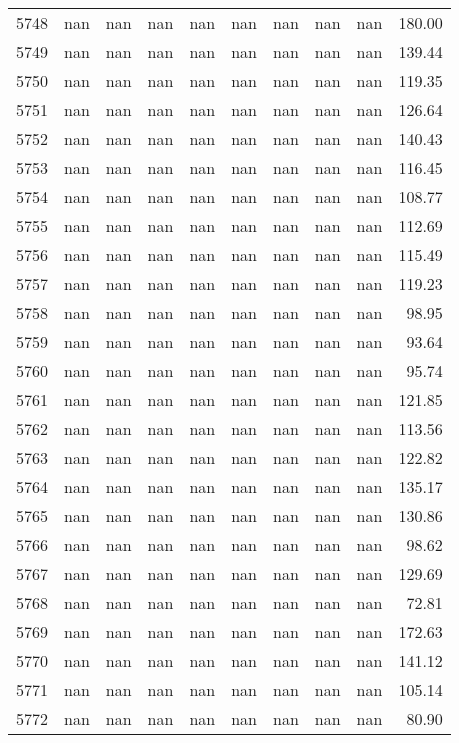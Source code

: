 \begin{tabular}{lrrrrrrrrr}
5748 & nan & nan & nan & nan & nan & nan & nan & nan & 180.00 \\
5749 & nan & nan & nan & nan & nan & nan & nan & nan & 139.44 \\
5750 & nan & nan & nan & nan & nan & nan & nan & nan & 119.35 \\
5751 & nan & nan & nan & nan & nan & nan & nan & nan & 126.64 \\
5752 & nan & nan & nan & nan & nan & nan & nan & nan & 140.43 \\
5753 & nan & nan & nan & nan & nan & nan & nan & nan & 116.45 \\
5754 & nan & nan & nan & nan & nan & nan & nan & nan & 108.77 \\
5755 & nan & nan & nan & nan & nan & nan & nan & nan & 112.69 \\
5756 & nan & nan & nan & nan & nan & nan & nan & nan & 115.49 \\
5757 & nan & nan & nan & nan & nan & nan & nan & nan & 119.23 \\
5758 & nan & nan & nan & nan & nan & nan & nan & nan & 98.95 \\
5759 & nan & nan & nan & nan & nan & nan & nan & nan & 93.64 \\
5760 & nan & nan & nan & nan & nan & nan & nan & nan & 95.74 \\
5761 & nan & nan & nan & nan & nan & nan & nan & nan & 121.85 \\
5762 & nan & nan & nan & nan & nan & nan & nan & nan & 113.56 \\
5763 & nan & nan & nan & nan & nan & nan & nan & nan & 122.82 \\
5764 & nan & nan & nan & nan & nan & nan & nan & nan & 135.17 \\
5765 & nan & nan & nan & nan & nan & nan & nan & nan & 130.86 \\
5766 & nan & nan & nan & nan & nan & nan & nan & nan & 98.62 \\
5767 & nan & nan & nan & nan & nan & nan & nan & nan & 129.69 \\
5768 & nan & nan & nan & nan & nan & nan & nan & nan & 72.81 \\
5769 & nan & nan & nan & nan & nan & nan & nan & nan & 172.63 \\
5770 & nan & nan & nan & nan & nan & nan & nan & nan & 141.12 \\
5771 & nan & nan & nan & nan & nan & nan & nan & nan & 105.14 \\
5772 & nan & nan & nan & nan & nan & nan & nan & nan & 80.90 \\

\end{tabular}
